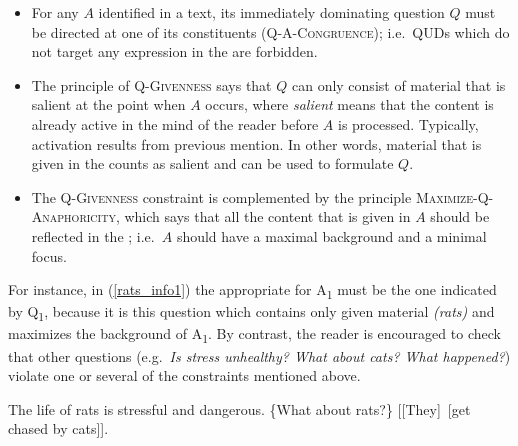 \documentclass[output=paper,
,modfonts
,nonflat]{langsci/langscibook}
\begin{document}
\begin{itemize}
\item For any  $A$ identified in a text, its immediately dominating question $Q$ must be directed at one of its constituents (\textsc{Q-A-Con\-gru\-ence}); i.e.\ QUDs which do not target any expression in the  are forbidden.

\item The principle of \textsc{Q-Givenness} says that $Q$ can only consist of material that is salient at the point when $A$ occurs, where \textit{salient} means that the content is already active in the mind of the reader before $A$ is processed. Typically, activation results from previous mention. In other words, material that is given in the  counts as salient and can be used to formulate $Q$.

\item The \textsc{Q-Givenness} constraint is complemented by the principle \textsc{Maximize-Q-Ana\-pho\-ri\-ci\-ty}, which says that all the content that is given in  $A$ should be reflected in the ; i.e.\ $A$ should have a maximal background and a minimal focus.
\end{itemize}

\noindent For instance, in (\ref{rats_info1}) the appropriate  for A\textsubscript{1} must be the one indicated by Q\textsubscript{1}, because it is this question which contains only given material \textit{(rats)} and maximizes the background of A\textsubscript{1}. By contrast, the reader is encouraged to check that other questions (e.g.\ \textit{Is stress unhealthy? What about cats? What happened?}) violate one or several of the constraints mentioned above. 

\begin{exe}
\ex\label{rats_info1}
\begin{xlist}
 The life of rats is stressful and dangerous.
 \{What about rats?\} 
 {[[They]\topic\ [get chased by cats]\focus]\sq}.
\end{xlist}
\end{exe}
\end{document}
